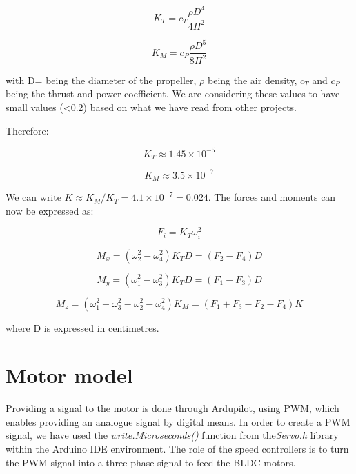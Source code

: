 \begin{equation}
	K_{T}=c_{T}\frac{\rho D^{4}}{4\Pi^{2}}
\end{equation}

\begin{equation}
	K_{M}=c_{P}\frac{\rho D^{5}}{8\Pi^{2}}
\end{equation}

with D= being the diameter of the propeller, $\rho$ being the air density, $ c_{T} $ and $ c_{P} $ being the thrust and power coefficient. We are considering these values to have small values (<0.2) based on what we have read from other projects.

Therefore:

\begin{equation}
	K_{T}\approx 1.45\times10^{-5}
\end{equation}

\begin{equation}
	K_{M} \approx 3.5\times10^{-7}
\end{equation}


We can write $K \approx K_{M}/K_{T}=4.1\times10^{-7}=0.024$. The forces and moments can now be expressed as:

\begin{equation}
	F_{i}=K_{T}\omega_{i}^{2}
\end{equation}

\begin{equation}
	M_{x}=(\omega_{2}^{2}-\omega_{4}^{2})K_{T}D=(F_{2}-F_{4})D
\end{equation}

\begin{equation}
	M_{y}=(\omega_{1}^{2}-\omega_{3}^{2})K_{T}D=(F_{1}-F_{3})D
\end{equation}

\begin{equation}
	M_{z}=(\omega_{1}^{2}+\omega_{3}^{2}-\omega_{2}^{2}-\omega_{4}^{2})K_{M}=(F_{1}+F_{3}-F_{2}-F_{4})K
\end{equation}

where D is expressed in centimetres.

\section{Motor model}
Providing a signal to the motor is done through Ardupilot, using PWM, which enables providing an analogue signal by digital means.  In order to create a PWM signal, we have used the \textit{write.Microseconds()} function from the\textit{Servo.h} library within the Arduino IDE environment. The role of the speed controllers is to turn the PWM signal into a three-phase signal to feed the BLDC motors.

